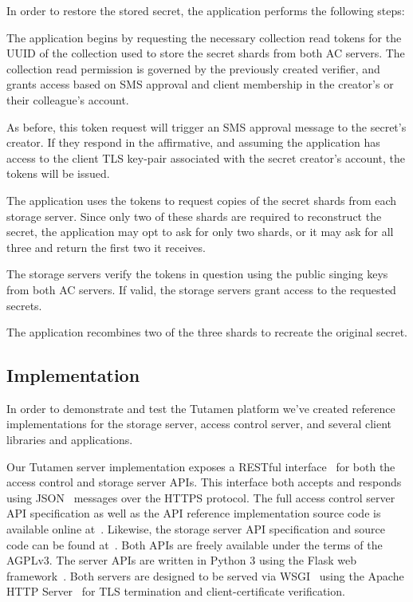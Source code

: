 In order to restore the stored secret, the application performs the
following steps:

\begin{packed_enum}
\item The application begins by requesting the necessary collection
  read tokens for the UUID of the collection used to store the secret
  shards from both AC servers. The collection read permission is
  governed by the previously created verifier, and grants access based
  on SMS approval and client membership in the creator's or their
  colleague's account.
\item As before, this token request will trigger an SMS approval
  message to the secret's creator. If they respond in the affirmative,
  and assuming the application has access to the client TLS key-pair
  associated with the secret creator's account, the tokens will be
  issued.
\item The application uses the tokens to request copies of the secret
  shards from each storage server. Since only two of these shards are
  required to reconstruct the secret, the application may opt to ask
  for only two shards, or it may ask for all three and return the
  first two it receives.
\item The storage servers verify the tokens in question using the
  public singing keys from both AC servers. If valid, the storage
  servers grant access to the requested secrets.
\item The application recombines two of the three shards to recreate
  the original secret.
\end{packed_enum}

\subsection{Implementation}

In order to demonstrate and test the Tutamen platform we've created
reference implementations for the storage server, access control
server, and several client libraries and applications.

Our Tutamen server implementation exposes a RESTful
interface~\cite{fielding2000} for both the access control and storage
server APIs. This interface both accepts and responds using
JSON~\cite{json} messages over the HTTPS protocol. The full access
control server API specification as well as the API reference
implementation source code is available online
at~\cite{src-tutamen-apiaccesscontrol}. Likewise, the storage server
API specification and source code can be found
at~\cite{src-tutamen-apistorage}. Both APIs are freely available under
the terms of the AGPLv3. The server APIs are written in Python 3 using
the Flask web framework~\cite{python-flask}. Both servers are designed
to be served via WSGI~\cite{pep3333} using the Apache HTTP
Server~\cite{apache} for TLS termination and client-certificate
verification.

